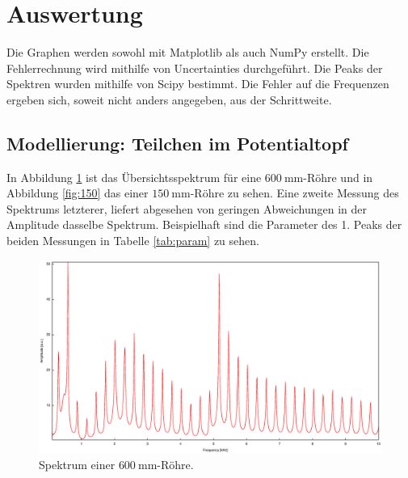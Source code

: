 \section{Auswertung}
\label{sec:Auswertung}

Die Graphen werden sowohl mit Matplotlib \cite{matplotlib} als auch NumPy \cite{numpy} erstellt. Die Fehlerrechnung wird mithilfe von Uncertainties \cite{uncertainties} durchgeführt. Die Peaks der Spektren wurden mithilfe von Scipy \cite{scipy} bestimmt. Die Fehler auf die Frequenzen ergeben sich, soweit nicht anders angegeben, aus der Schrittweite.

\subsection{Modellierung: Teilchen im Potentialtopf}

In Abbildung \ref{fig:Uebersicht} ist das Übersichtsspektrum für eine $\SI{600}{\milli\meter}$-Röhre und in Abbildung \ref{fig:150} das einer $\SI{150}{\milli\meter}$-Röhre zu sehen.
Eine zweite Messung des Spektrums letzterer, liefert abgesehen von geringen Abweichungen in der Amplitude dasselbe Spektrum.
Beispielhaft sind die Parameter des 1. Peaks der beiden Messungen in Tabelle \ref{tab:param} zu sehen.

\begin{figure}
\centering
\includegraphics[width=\linewidth-70pt,height=\textheight-70pt,keepaspectratio]{FP-V23data/1.1_600mm.eps}
\caption{Spektrum einer $\SI{600}{\milli\meter}$-Röhre.}
\label{fig:Uebersicht}
\end{figure}

